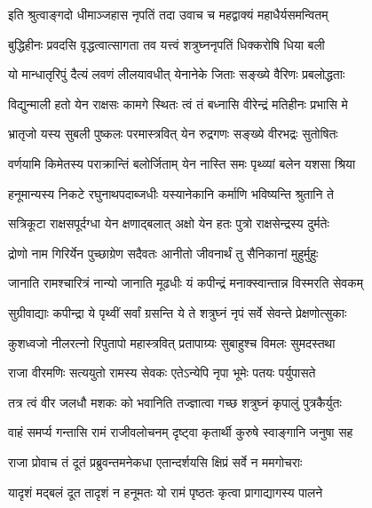 \twolineshloka
{इति श्रुत्वाङ्गदो धीमाञ्जहास नृपतिं तदा}
{उवाच च महद्वाक्यं महाधैर्यसमन्वितम्}%


\twolineshloka
{बुद्धिहीनः प्रवदसि वृद्धत्वात्सागता तव}
{यत्त्वं शत्रुघ्ननृपतिं धिक्करोषि धिया बली}%

\twolineshloka
{यो मान्धातृरिपुं दैत्यं लवणं लीलयावधीत्}
{येनानेके जिताः सङ्ख्ये वैरिणः प्रबलोद्धताः}%

\twolineshloka
{विद्युन्माली हतो येन राक्षसः कामगे स्थितः}
{त्वं तं बध्नासि वीरेन्द्रं मतिहीनः प्रभासि मे}%

\twolineshloka
{भ्रातृजो यस्य सुबली पुष्कलः परमास्त्रवित्}
{येन रुद्रगणः सङ्ख्ये वीरभद्रः सुतोषितः}%

\twolineshloka
{वर्णयामि किमेतस्य पराक्रान्तिं बलोर्जिताम्}
{येन नास्ति समः पृथ्व्यां बलेन यशसा श्रिया}%

\twolineshloka
{हनूमान्यस्य निकटे रघुनाथपदाब्जधीः}
{यस्यानेकानि कर्माणि भविष्यन्ति श्रुतानि ते}%

\twolineshloka
{सत्रिकूटा राक्षसपूर्दग्धा येन क्षणाद्बलात्}
{अक्षो येन हतः पुत्रो राक्षसेन्द्रस्य दुर्मतेः}%

\twolineshloka
{द्रोणो नाम गिरिर्येन पुच्छाग्रेण सदैवतः}
{आनीतो जीवनार्थं तु सैनिकानां मुहुर्मुहुः}%

\twolineshloka
{जानाति रामश्चारित्रं नान्यो जानाति मूढधीः}
{यं कपीन्द्रं मनाक्स्वान्तान्न विस्मरति सेवकम्}%

\twolineshloka
{सुग्रीवाद्याः कपीन्द्रा ये पृथ्वीं सर्वां ग्रसन्ति ये}
{ते शत्रुघ्नं नृपं सर्वे सेवन्ते प्रेक्षणोत्सुकाः}%

\twolineshloka
{कुशध्वजो नीलरत्नो रिपुतापो महास्त्रवित्}
{प्रतापाग्र्यः सुबाहुश्च विमलः सुमदस्तथा}%

\twolineshloka
{राजा वीरमणिः सत्ययुतो रामस्य सेवकः}
{एतेऽन्येपि नृपा भूमेः पतयः पर्युपासते}%

\twolineshloka
{तत्र त्वं वीर जलधौ मशकः को भवानिति}
{तज्ज्ञात्वा गच्छ शत्रुघ्नं कृपालुं पुत्रकैर्युतः}%

\twolineshloka
{वाहं समर्प्य गन्तासि रामं राजीवलोचनम्}
{दृष्ट्वा कृतार्थी कुरुषे स्वाङ्गानि जनुषा सह}%


\twolineshloka
{राजा प्रोवाच तं दूतं प्रब्रुवन्तमनेकधा}
{एतान्दर्शयसि क्षिप्रं सर्वे न ममगोचराः}%

\twolineshloka
{यादृशं मद्बलं दूत तादृशं न हनूमतः}
{यो रामं पृष्ठतः कृत्वा प्रागाद्यागस्य पालने}%

